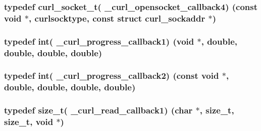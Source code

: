 \subsubsection[{\texorpdfstring{\+\_\+curl\+\_\+opensocket\+\_\+callback4}{_curl_opensocket_callback4}}]{\setlength{\rightskip}{0pt plus 5cm}typedef {\bf curl\+\_\+socket\+\_\+t}( \+\_\+curl\+\_\+opensocket\+\_\+callback4) (const void $\ast$, {\bf curlsocktype}, const struct {\bf curl\+\_\+sockaddr} $\ast$)}\hypertarget{typecheck-gcc_8h_ac996e9ffa7bb261a4589ce066ac69bb9}{}\label{typecheck-gcc_8h_ac996e9ffa7bb261a4589ce066ac69bb9}
\subsubsection[{\texorpdfstring{\+\_\+curl\+\_\+progress\+\_\+callback1}{_curl_progress_callback1}}]{\setlength{\rightskip}{0pt plus 5cm}typedef int( \+\_\+curl\+\_\+progress\+\_\+callback1) (void $\ast$, double, double, double, double)}\hypertarget{typecheck-gcc_8h_a4a19f089bb72a78916e0c8f6d3eabb43}{}\label{typecheck-gcc_8h_a4a19f089bb72a78916e0c8f6d3eabb43}
\subsubsection[{\texorpdfstring{\+\_\+curl\+\_\+progress\+\_\+callback2}{_curl_progress_callback2}}]{\setlength{\rightskip}{0pt plus 5cm}typedef int( \+\_\+curl\+\_\+progress\+\_\+callback2) (const void $\ast$, double, double, double, double)}\hypertarget{typecheck-gcc_8h_a07f7e31041e7c89dd37e0abaa886eda1}{}\label{typecheck-gcc_8h_a07f7e31041e7c89dd37e0abaa886eda1}
\subsubsection[{\texorpdfstring{\+\_\+curl\+\_\+read\+\_\+callback1}{_curl_read_callback1}}]{\setlength{\rightskip}{0pt plus 5cm}typedef size\+\_\+t( \+\_\+curl\+\_\+read\+\_\+callback1) (char $\ast$, size\+\_\+t, size\+\_\+t, void $\ast$)}\hypertarget{typecheck-gcc_8h_aa598cc71fb379db1bc23ff76e8b875c1}{}\label{typecheck-gcc_8h_aa598cc71fb379db1bc23ff76e8b875c1}
